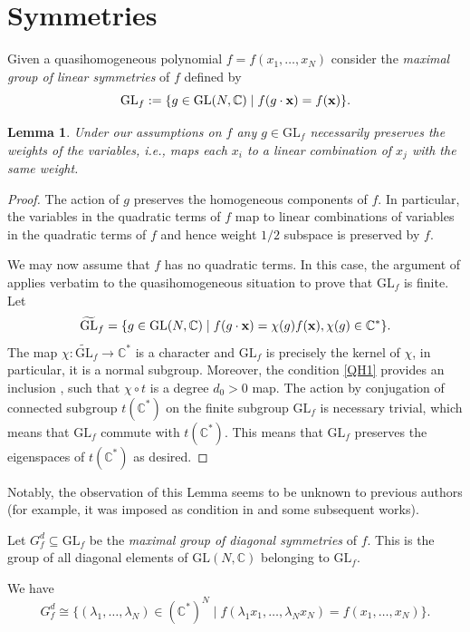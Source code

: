 \documentclass[10pt,a4paper]{amsart}
\numberwithin{equation}{section}
\newtheorem{Lemma}[Theorem]{Lemma}
\newcommand{\CC}{{\mathbb{C}}}
\newcommand{\GL}{{\mathrm{GL}}}
\newcommand{\bx}{{\bf x}}
\newcommand\wt{\widetilde}
\begin{document}
\section{Symmetries}\label{section: symmetries}
Given a quasihomogeneous polynomial $f = f(x_1,\dots,x_N)$ consider the
\textit{maximal group of linear symmetries} of $f$ defined by
\[
	\GL_f :=  \lbrace g \in \GL(N,\CC) \mid f(g \cdot \bx) = f(\bx) \rbrace.
\]

\begin{Lemma}
 Under our assumptions on $f$ any $g \in \GL_f$ necessarily preserves the weights of the variables, i.e., maps each $x_i$ to a linear combination of $x_j$ with the same weight.
\end{Lemma}
\begin{proof}
The action of $g$ preserves the homogeneous components of $f$. In particular, the variables in the quadratic terms of $f$ map to linear combinations of variables in the quadratic terms of $f$ and hence weight $1/2$ subspace is preserved by $f$.

We may now assume that $f$ has no quadratic terms. In this case, the argument of \cite[Theorem 2.1]{OS78} applies verbatim to the quasihomogeneous situation to prove that $\GL_f$ is finite. Let \[\wt{\GL}_f= \lbrace g \in \GL(N,\CC) \mid f(g \cdot \bx) = \chi(g)f(\bx), \chi(g)\in\CC^*  \rbrace.\]
The map $\chi\colon\wt{\GL}_f\to\CC^*$ is a character and $\GL_f$ is precisely the kernel of $\chi$, in particular, it is a normal subgroup. Moreover, the condition \eqref{QH1} provides an inclusion \smash{$t\colon\CC^*\hookrightarrow\wt{\GL}_f$}, such that $\chi\circ t$ is a degree $d_0>0$ map. The action by conjugation of connected subgroup $t(\CC^*)$ on the finite subgroup $\GL_f$ is necessary trivial, which means that $\GL_f$ commute with $t(\CC^*)$. This means that $\GL_f$ preserves the eigenspaces of $t(\CC^*)$ as desired.
\end{proof}

\begin{Remark}
 Notably, the observation of this Lemma seems to be unknown to previous authors (for example, it was imposed as condition in \cite{Muk} and some subsequent works).
\end{Remark}

Let $G_f^d \subseteq \GL_f$ be the \textit{maximal group of diagonal symmetries} of $f$. This is the group of all diagonal elements of $\GL(N,\CC)$ belonging to $\GL_f$.

We have
\[
	G_f^d \cong \bigl\lbrace (\lambda_1,\dots,\lambda_N) \in (\CC^*)^N \mid f(\lambda_1x_1,\dots,\lambda_Nx_N) = f(x_1,\dots,x_N) \bigr\rbrace.
\]
\end{document}
